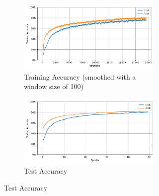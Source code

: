        \begin{figure}[H]
            \centering
            \begin{subfigure}[H]{0.89\textwidth}
                \centering
                \begin{subfigure}[H]{\textwidth}
                    \includegraphics[width=\textwidth]{../timesteps/CIFAR10/plots/cifar10_train_acc.pdf}
                    \caption{Training Accuracy (smoothed with a window size of 100)}
                \end{subfigure}
                \hfill
                \begin{subfigure}[H]{\textwidth}
                    \includegraphics[width=\textwidth]{../timesteps/CIFAR10/plots/cifar10_test_acc.pdf}
                    \caption{Test Accuracy}
                \end{subfigure}
            \end{subfigure}
            \hfill
            \begin{subfigure}[H]{0.1\textwidth}

\end{subfigure}
\end{figure}
